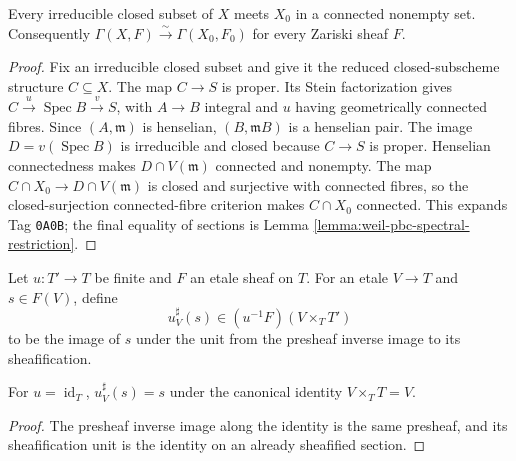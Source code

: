 \begin{lemma}
\label{lemma:weil-pbc-stein-connectedness}
Every irreducible closed subset of $X$ meets $X_0$ in a connected nonempty
set.  Consequently $\Gamma(X,F)\xrightarrow{\sim}\Gamma(X_0,F_0)$ for every
Zariski sheaf $F$.
\end{lemma}
\begin{proof}

Fix an irreducible closed subset and give it the reduced closed-subscheme
structure $C\subseteq X$.  The map $C\to S$ is proper.  Its Stein
factorization gives $C\xrightarrow{u}\operatorname{Spec}B
\xrightarrow{v}S$, with $A\to B$ integral and $u$ having geometrically
connected fibres.  Since $(A,\mathfrak m)$ is henselian,
$(B,\mathfrak mB)$ is a henselian pair.  The image
$D=v(\operatorname{Spec}B)$ is irreducible and closed because $C\to S$ is
proper.  Henselian connectedness makes $D\cap V(\mathfrak m)$ connected and
nonempty.  The map
$C\cap X_0\to D\cap V(\mathfrak m)$ is closed and surjective with connected
fibres, so the closed-surjection connected-fibre criterion makes
$C\cap X_0$ connected.  This expands Tag
\texttt{0A0B}; the final equality of sections is Lemma
\ref{lemma:weil-pbc-spectral-restriction}.
\end{proof}

\begin{definition}
\label{def:weil-pbc-finite-section-pullback}
\uses{}
Let $u:T'\to T$ be finite and $F$ an etale sheaf on $T$.  For an etale
$V\to T$ and $s\in F(V)$, define
\[
 u_V^\sharp(s)\in(u^{-1}F)(V\times_TT')
\]
to be the image of $s$ under the unit from the presheaf inverse image to its
sheafification.
\end{definition}

\begin{lemma}
\label{lemma:weil-pbc-finite-pullback-identity}
For $u=\operatorname{id}_T$, $u_V^\sharp(s)=s$ under the canonical identity
$V\times_TT=V$.
\end{lemma}
\begin{proof}
The presheaf inverse image along the identity is the same presheaf, and its
sheafification unit is the identity on an already sheafified section.
\end{proof}

